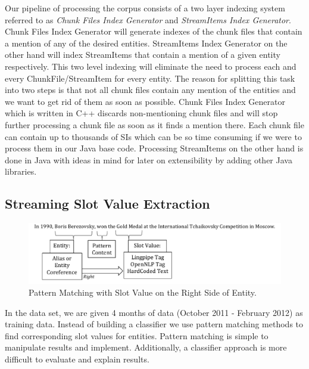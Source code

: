 Our pipeline of processing the corpus consists of a two layer indexing system 
referred to as \textit{Chunk Files Index Generator} and \textit{StreamItems Index Generator}.
Chunk Files Index Generator will generate indexes of the chunk files 
that contain a mention of any of the desired entities. StreamItems Index Generator 
on the other hand will index StreamItems that contain a mention of a given entity 
respectively. This two level indexing will eliminate the need to process each and 
every ChunkFile/StreamItem for every entity. The reason for splitting this task 
into two steps is that not all chunk files contain any mention of the entities and 
we want to get rid of them as soon as possible. Chunk Files Index Generator which 
is written in C++ discards non-mentioning chunk files and will stop further 
processing a chunk file as soon as it finds a mention there. Each chunk file can 
contain up to thousands of SIs which can be so time consuming if we were to 
process them in our Java base code. Processing StreamItems on the other hand is 
done in Java with ideas in mind for later on extensibility by adding other Java libraries.



\subsection{Streaming Slot Value Extraction}
\label{sec:ssve}
\begin{figure}
\centering
\includegraphics[width=6in]{./images/Pattern-crop.pdf}
\vspace*{-.1in} \caption{Pattern Matching with Slot Value on the Right Side of Entity. }\label{fig:pattern}
\vspace*{-.2in}
\end{figure}

In the data set, we are given 4 months of data (October 2011 - February 2012) as training data.
Instead of building a classifier we use pattern matching methods to find
corresponding slot values for entities. 
Pattern matching is simple to manipulate results and implement.
Additionally, a classifier approach is more difficult to evaluate and explain results.

